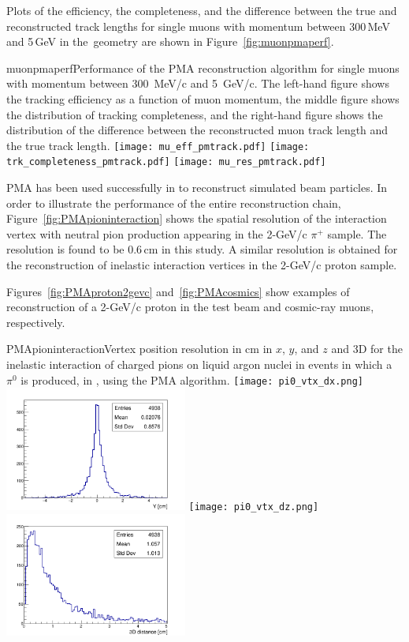 Plots of the efficiency, the completeness, and the  difference between the true and reconstructed
track lengths for single muons with momentum between 300\,MeV and 5\,GeV in the~\pdsp geometry are
shown in Figure~\ref{fig:muonpmaperf}.  

\begin{cdrfigure}{muonpmaperf}{Performance of the PMA reconstruction algorithm for single muons with 
momentum between 300~MeV/c and 5~GeV/c.  The left-hand figure shows the tracking efficiency as a function of
muon momentum, the middle figure shows the distribution of tracking completeness, and the right-hand figure shows the
distribution of the difference between the reconstructed muon track length and the true track length.}
\texttt{[image: mu\_eff\_pmtrack.pdf]}
\texttt{[image: trk\_completeness\_pmtrack.pdf]}
\texttt{[image: mu\_res\_pmtrack.pdf]}
\end{cdrfigure}

PMA has been used successfully in \pdsp to reconstruct simulated beam particles. In order to illustrate the performance of the entire reconstruction chain,
Figure~\ref{fig:PMApioninteraction} shows the spatial resolution of the interaction vertex with neutral pion
production appearing in the 2-GeV/c $\pi^+$ sample.
The resolution is found to be 0.6\,cm in this study.
A similar resolution is obtained for the reconstruction
of inelastic interaction vertices in the 2-GeV/c proton sample. 


Figures~\ref{fig:PMAproton2gevc}
and~\ref{fig:PMAcosmics} show examples of reconstruction of a 2-GeV/c proton in the test beam and
cosmic-ray muons, respectively.

\begin{cdrfigure}{PMApioninteraction}{Vertex position resolution in cm in $x$, $y$, and $z$ and 3D for the
  inelastic interaction of charged pions on liquid argon nuclei in events in which a $\pi^0$ is produced, in
  \pdsp, using the PMA algorithm.}
\texttt{[image: pi0\_vtx\_dx.png]}\includegraphics[width=0.45\textwidth]{figures/pi0_vtx_dy.png}
\texttt{[image: pi0\_vtx\_dz.png]}\includegraphics[width=0.45\textwidth]{figures/pi0_vtx3d.png}
\end{cdrfigure}


